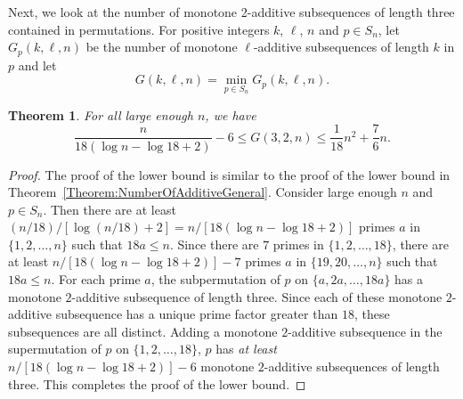 \documentclass[10pt,a4paper]{amsart}
\newtheorem{theorem}{Theorem}[section]
\begin{document}
Next, we look at the number of monotone 2-additive subsequences of length three contained in permutations. For positive integers $k$, $\ell$, $n$ and $p\in S_n$, let $G_p(k,\ell,n)$ be the number of monotone $\ell$-additive subsequences of length $k$ in $p$ and let 
\[
G(k,\ell,n)=\min_{p\in S_n}G_p(k,\ell,n).
\]
\begin{theorem}
For all large enough $n$, we have
    \[
    \frac{n}{18(\log n-\log18+2)}-6\leq G(3,2,n)\leq\frac{1}{18}n^2+\frac{7}{6}n.
    \]
\end{theorem}
\begin{proof}
The proof of the lower bound is similar to the proof of the lower bound in Theorem~\ref{Theorem:NumberOfAdditiveGeneral}. Consider large enough $n$ and $p\in S_n$. Then there are at least $(n/18)/[\log(n/18)+2]=n/[18(\log n-\log18+2)]$ primes $a$ in $\{1,2,\ldots,n\}$ such that $18a\leq n$. Since there are $7$ primes in $\{1,2,\ldots,18\}$, there are at least $
n/[18(\log n-\log18+2)]-7
$
primes $a$ in $\{19,20,\ldots,n\}$ such that $18a\leq n$. For each prime $a$, the subpermutation of $p$ on $\{a,2a,\ldots,18a\}$ has a monotone $2$-additive subsequence of length three. Since each of these monotone $2$-additive subsequence has a unique prime factor greater than $18$, these subsequences are all distinct. Adding a monotone $2$-additive subsequence in the supermutation of $p$ on $\{1,2,\ldots,18\}$, $p$ has \textit{at least} $
n/[18(\log n-\log18+2)]-6
$ monotone $2$-additive subsequences of length three. This completes the proof of the lower bound.


\end{proof}
\end{document}
